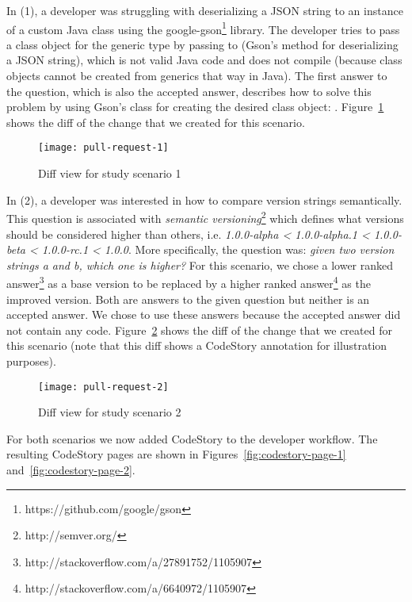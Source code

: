 \documentclass[../manifest.tex]{subfiles}
\begin{document}
In (1), a developer was struggling with deserializing a JSON string to an instance of a custom Java class using the google-gson\footnote{https://github.com/google/gson} library. The developer tries to pass a class object for the generic type  by passing  to  (Gson's method for deserializing a JSON string), which is not valid Java code and does not compile (because class objects cannot be created from generics that way in Java). The first answer to the question, which is also the accepted answer, describes how to solve this problem by using Gson's  class for creating the desired class object: . Figure~\ref{fig:pull-request-1} shows the diff of the change that we created for this scenario.

\begin{figure}[h]
  \centering
  \texttt{[image: pull-request-1]}
  \caption{Diff view for study scenario 1}
  \label{fig:pull-request-1}
\end{figure}

In (2), a developer was interested in how to compare version strings semantically. This question is associated with \textit{semantic versioning}\footnote{http://semver.org/} which defines what versions should be considered higher than others, i.e. \textit{1.0.0-alpha < 1.0.0-alpha.1 < 1.0.0-beta < 1.0.0-rc.1 < 1.0.0}. More specifically, the question was: \textit{given two version strings a and b, which one is higher?} For this scenario, we chose a lower ranked answer\footnote{http://stackoverflow.com/a/27891752/1105907} as a base version to be replaced by a higher ranked answer\footnote{http://stackoverflow.com/a/6640972/1105907} as the improved version. Both are answers to the given question but neither is an accepted answer. We chose to use these answers because the accepted answer did not contain any code. Figure~\ref{fig:pull-request-2} shows the diff of the change that we created for this scenario (note that this diff shows a CodeStory annotation for illustration purposes).

\begin{figure}[h]
  \centering
  \texttt{[image: pull-request-2]}
  \caption{Diff view for study scenario 2}
  \label{fig:pull-request-2}
\end{figure}

For both scenarios we now added CodeStory to the developer workflow. The resulting CodeStory pages are shown in Figures~\ref{fig:codestory-page-1} and~\ref{fig:codestory-page-2}.
\end{document}
